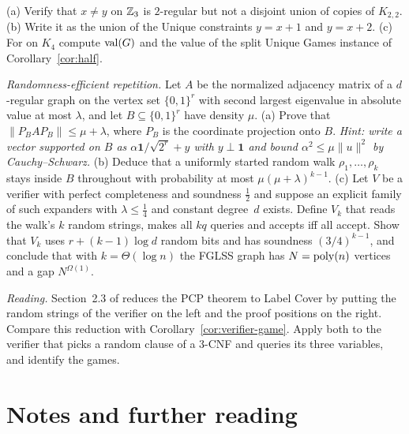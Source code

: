 \begin{exercise}[\stars{$\star$}]\label{ex:3cut}
(a) Verify that $x\ne y$ on $\mathbb{Z}_3$ is $2$-regular but not a disjoint union of copies of $K_{2,2}$.  (b) Write it as the union of the Unique constraints $y=x+1$ and $y=x+2$.  (c) For  on $K_4$ compute $\operatorname{val}(G)$ and the value of
the split Unique Games instance of Corollary~\ref{cor:half}.
\end{exercise}

\begin{exercise}[\stars{$\star\star\star$}]\label{ex:expander}
\emph{Randomness-efficient repetition.}  Let $A$ be the normalized adjacency matrix of a $d$-regular graph on the vertex set $\{0,1\}^r$ with second largest eigenvalue in absolute value at most $\lambda$, and let $B\subseteq\{0,1\}^r$ have density $\mu$.
(a) Prove that $\|P_BAP_B\|\le\mu+\lambda$, where $P_B$ is the coordinate projection onto $B$.  \emph{Hint: write a vector supported on $B$ as $\alpha\mathbf1/\sqrt{2^r}+y$ with $y\perp\mathbf1$ and bound $\alpha^2\le\mu\|u\|^2$ by Cauchy--Schwarz.}
(b) Deduce that a uniformly started random walk $\rho_1,\dots,\rho_k$ stays inside $B$ throughout with probability at most $\mu(\mu+\lambda)^{k-1}$.
(c) Let $V$ be a verifier with perfect completeness and soundness $\tfrac12$ and suppose an explicit family of such expanders with $\lambda\le\tfrac14$ and constant degree~$d$ exists.  Define $V_k$ that reads the walk's $k$ random strings, makes all $kq$ queries and
accepts iff all accept.  Show that $V_k$ uses $r+(k-1)\log d$ random bits and has soundness $(3/4)^{k-1}$, and conclude that with $k=\Theta(\log n)$ the FGLSS graph has $N=\operatorname{poly}(n)$ vertices and a gap $N^{\Omega(1)}$.
\end{exercise}

\begin{exercise}[\stars{$\star\star$}]\label{ex:reading2}
\emph{Reading.}  Section~2.3 of \citet{DIMACS10} reduces the PCP theorem to Label Cover by putting the random strings of the verifier on the left and the proof positions on the right.  Compare this reduction with Corollary~\ref{cor:verifier-game}.
Apply both to the verifier that picks a random clause of a $3$-CNF and queries its three variables, and identify the games.
\end{exercise}


\section*{Notes and further reading}

